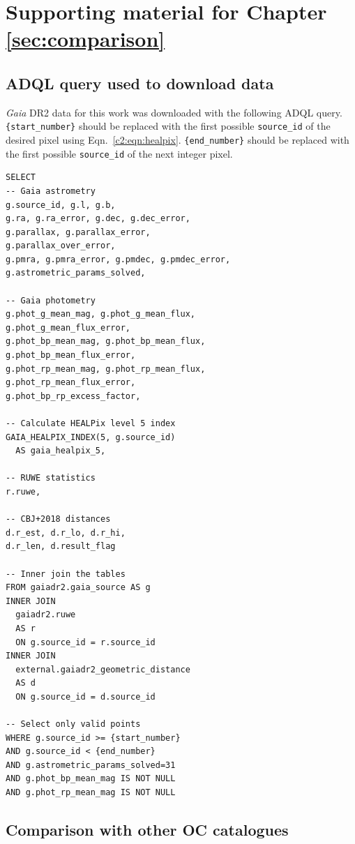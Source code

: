 %
\chapter{Supporting material for Chapter \ref{sec:comparison}}
\label{sec:appendix}


\section{ADQL query used to download data}\label{app:c2:adql}

 \emph{Gaia}  DR2 data for this work was downloaded with the following ADQL query. \texttt{\{start\_number\}} should be replaced with the first possible \texttt{source\_id} of the desired pixel using Eqn.~\ref{c2:eqn:healpix}. \texttt{\{end\_number\}} should be replaced with the first possible \texttt{source\_id} of the next integer pixel.

\begin{verbatim}
SELECT
-- Gaia astrometry
g.source_id, g.l, g.b, 
g.ra, g.ra_error, g.dec, g.dec_error, 
g.parallax, g.parallax_error, 
g.parallax_over_error, 
g.pmra, g.pmra_error, g.pmdec, g.pmdec_error, 
g.astrometric_params_solved, 

-- Gaia photometry
g.phot_g_mean_mag, g.phot_g_mean_flux, 
g.phot_g_mean_flux_error, 
g.phot_bp_mean_mag, g.phot_bp_mean_flux, 
g.phot_bp_mean_flux_error, 
g.phot_rp_mean_mag, g.phot_rp_mean_flux, 
g.phot_rp_mean_flux_error, 
g.phot_bp_rp_excess_factor, 

-- Calculate HEALPix level 5 index
GAIA_HEALPIX_INDEX(5, g.source_id) 
  AS gaia_healpix_5, 
               
-- RUWE statistics
r.ruwe, 
               
-- CBJ+2018 distances
d.r_est, d.r_lo, d.r_hi, 
d.r_len, d.result_flag 
               
-- Inner join the tables
FROM gaiadr2.gaia_source AS g 
INNER JOIN 
  gaiadr2.ruwe 
  AS r 
  ON g.source_id = r.source_id 
INNER JOIN 
  external.gaiadr2_geometric_distance 
  AS d 
  ON g.source_id = d.source_id 
           
-- Select only valid points
WHERE g.source_id >= {start_number} 
AND g.source_id < {end_number} 
AND g.astrometric_params_solved=31 
AND g.phot_bp_mean_mag IS NOT NULL 
AND g.phot_rp_mean_mag IS NOT NULL
\end{verbatim}


\section{Comparison with other OC catalogues}\label{app:c2:comparison_with_cats}

